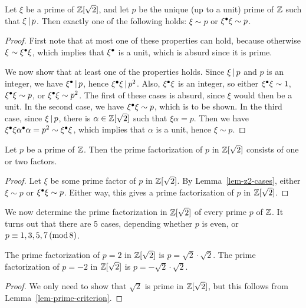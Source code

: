 \begin{lemma}\label{lem-z2-cases}
  Let $\xi$ be a prime of $\mathbb{Z}[\sqrt2]$, and let $p$ be the unique (up
  to a unit) prime of $\mathbb{Z}$ such that $\xi\mathop{|}\nolimits p$. Then exactly one of
  the following holds: $\xi\sim p$ or $\xi^{\bullet}\xi\sim p$.
\end{lemma}

\begin{proof}
  First note that at most one of these properties can hold, because
  otherwise $\xi\sim\xi^{\bullet}\xi$, which implies that $\xi^{\bullet}$ is a
  unit, which is absurd since it is prime.

  We now show that at least one of the properties holds. Since
  $\xi\mathop{|}\nolimits p$ and $p$ is an integer, we have $\xi^{\bullet}\mathop{|}\nolimits p$, hence
  $\xi^{\bullet}\xi\mathop{|}\nolimits p^2$. Also, $\xi^{\bullet}\xi$ is an integer, so either
  $\xi^{\bullet}\xi\sim 1$, $\xi^{\bullet}\xi\sim p$, or $\xi^{\bullet}\xi\sim p^2$. The
  first of these cases is absurd, since $\xi$ would then be a unit. In
  the second case, we have $\xi^{\bullet}\xi\sim p$, which is to be
  shown. In the third case, since $\xi\mathop{|}\nolimits p$, there is
  $\alpha\in\mathbb{Z}[\sqrt2]$ such that $\xi\alpha=p$. Then we have
  $\xi^{\bullet}\xi\alpha^{\bullet}\alpha=p^2\sim\xi^{\bullet}\xi$, which implies that
  $\alpha$ is a unit, hence $\xi\sim p$.
\end{proof}

\begin{lemma}\label{lem-prime-factor-z2}
  Let $p$ be a prime of $\mathbb{Z}$. Then the prime factorization of $p$ in
  $\mathbb{Z}[\sqrt2]$ consists of one or two factors. 
\end{lemma}

\begin{proof}
  Let $\xi$ be some prime factor of $p$ in $\mathbb{Z}[\sqrt2]$. By
  Lemma~\ref{lem-z2-cases}, either $\xi\sim p$ or $\xi^{\bullet}\xi\sim
  p$. Either way, this gives a prime factorization of $p$ in $\mathbb{Z}[\sqrt2]$.
\end{proof}

We now determine the prime factorization in $\mathbb{Z}[\sqrt2]$ of every
prime $p$ of $\mathbb{Z}$. It turns out that there are 5 cases, depending
whether $p$ is even, or $p\equiv 1, 3, 5, 7\,(\mathop{{\rm mod}}8)$.

\begin{lemma}\label{lem-2}
  The prime factorization of $p=2$ in $\mathbb{Z}[\sqrt2]$ is $p =
  \sqrt{2}\cdot \sqrt{2}$. The prime factorization of $p=-2$ in
  $\mathbb{Z}[\sqrt2]$ is $p=-\sqrt{2}\cdot\sqrt{2}$.
\end{lemma}

\begin{proof}
  We only need to show that $\sqrt2$ is prime in $\mathbb{Z}[\sqrt2]$, but
  this follows from Lemma~\ref{lem-prime-criterion}.
\end{proof}

